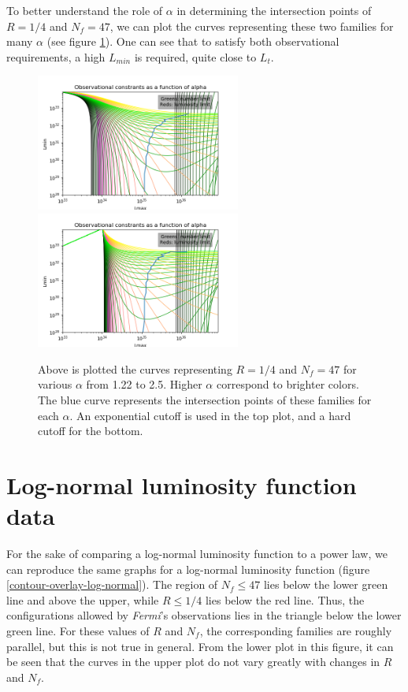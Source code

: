 \documentclass{C://Aliases//Dropbox-MIT//Latex_Templates//personal}
\begin{document}
To better understand the role of $\alpha$ in determining the intersection points of $R=1/4$ and $N_f = 47$, we can plot the curves representing these two families for many $\alpha$ (see figure \ref{contour-vary-alpha}). One can see that to satisfy both observational requirements, a high $L_{min}$ is required, quite close to $L_t$.

\begin{figure}[h]
    \label{contour-vary-alpha}
    \centering
    \includegraphics[width=0.6\textwidth]{../../luminosity-models/power-law/contour-vary-alpha-exp.png}
    \includegraphics[width=0.6\textwidth]{../../luminosity-models/power-law/contour-vary-alpha-hard.png}
    \caption{Above is plotted the curves representing $R=1/4$ and $N_f=47$ for various $\alpha$ from 1.22 to 2.5. Higher $\alpha$ correspond to brighter colors. The blue curve represents the intersection points of these families for each $\alpha$. An exponential cutoff is used in the top plot, and a hard cutoff for the bottom.}
\end{figure}



\section{Log-normal luminosity function data}
For the sake of comparing a log-normal luminosity function to a power law, we can reproduce the same graphs for a log-normal luminosity function (figure \ref{contour-overlay-log-normal}). The region of $N_f \leq 47$ lies below the lower green line and above the upper, while $R \leq 1/4$ lies below the red line. Thus, the configurations allowed by \textit{Fermi}'s observations lies in the triangle below the lower green line. For these values of $R$ and $N_f$, the corresponding families are roughly parallel, but this is not true in general. From the lower plot in this figure, it can be seen that the curves in the upper plot do not vary greatly with changes in $R$ and $N_f$.
\end{document}
